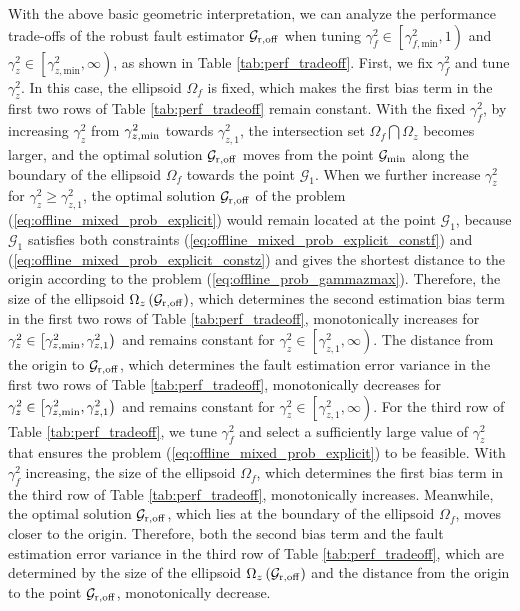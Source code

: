 \documentclass[twocolumn]{autart}
\begin{document}
With the above basic geometric interpretation, we can analyze the performance trade-offs of the robust fault estimator $\mathcal{G}_{\rm{r,off}}$ when tuning $\gamma_f^2 \in \left[ \gamma_{f,\text{min}}^2, 1 \right)$ and $\gamma_z^2 \in \left[ \gamma_{z,\text{min}}^2, \infty \right)$, as shown in Table \ref{tab:perf_tradeoff}.
First, we fix $\gamma_f^2$ and tune $\gamma_z^2$. In this case, the ellipsoid $\Omega_f$ is fixed, which makes the first bias term in the first two rows of Table \ref{tab:perf_tradeoff} remain constant.
With the fixed $\gamma_f^2$, by increasing $\gamma_{z}^2$ from $\gamma_{z,\rm{min}}^2$ towards $\gamma_{z,1}^2$, the intersection set $\Omega_f \bigcap \Omega_z$ becomes larger, and the optimal solution $\mathcal{G}_{\rm{r,off}}$ moves from the point $\mathcal{G}_{\rm{min}}$ along the boundary of the ellipsoid $\Omega_f$ towards the point $\mathcal{G}_1$.
When we further increase $\gamma_z^2$ for $\gamma_z^2 \geq \gamma_{z,1}^2$, the optimal solution $\mathcal{G}_{\rm{r,off}}$ of the problem (\ref{eq:offline_mixed_prob_explicit}) would remain located at the point $\mathcal{G}_{1}$, because $\mathcal{G}_{1}$ satisfies both constraints (\ref{eq:offline_mixed_prob_explicit_constf}) and
(\ref{eq:offline_mixed_prob_explicit_constz}) and gives the shortest distance to the origin according to the problem (\ref{eq:offline_prob_gammazmax}).
Therefore, the size of the ellipsoid $\Omega_z \left( \mathcal{G}_{\rm{r,off}} \right)$, which determines the second estimation bias term in the first two rows of Table \ref{tab:perf_tradeoff}, monotonically increases for
$\gamma_z^2 \in \left[ \gamma_{z,\rm{min}}^2, \gamma_{z,1}^2 \right)$ and remains constant for
$\gamma_z^2 \in \left[ \gamma_{z,1}^2, \infty \right)$. The distance from the origin to $\mathcal{G}_{\rm{r,off}}$, which determines the fault estimation error variance in the first two rows of Table \ref{tab:perf_tradeoff}, monotonically decreases for
$\gamma_z^2 \in \left[ \gamma_{z,\rm{min}}^2, \gamma_{z,1}^2 \right)$ and remains constant for $\gamma_z^2 \in \left[ \gamma_{z,1}^2, \infty \right)$. For the third row of Table \ref{tab:perf_tradeoff}, we tune $\gamma_f^2$ and select a sufficiently large value of $\gamma_z^2$ that ensures the problem (\ref{eq:offline_mixed_prob_explicit}) to be feasible. With $\gamma_f^2$ increasing, the size of the ellipsoid $\Omega_f$, which determines the first bias term in the third row of Table \ref{tab:perf_tradeoff}, monotonically increases. Meanwhile, the optimal solution
$\mathcal{G}_{\rm{r,off}}$, which lies at the boundary of the ellipsoid $\Omega_f$, moves closer to the origin. Therefore, both the second bias term and the fault estimation error variance in the third row of Table \ref{tab:perf_tradeoff}, which are determined by the size of the ellipsoid $\Omega_z \left( \mathcal{G}_{\rm{r,off}} \right)$ and the distance from the origin to the point $\mathcal{G}_{\rm{r,off}}$, monotonically decrease.
\end{document}
